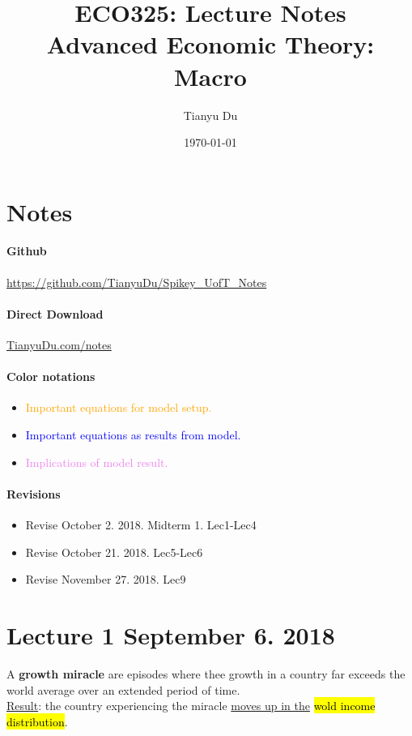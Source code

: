 \documentclass[11pt]{article}
\title{ECO325: Lecture Notes \\ \small Advanced Economic Theory: Macro}
\author{Tianyu Du}
\date{\today}
\begin{document}
    \maketitle
    \doclicenseThis
    \section*{Notes}
    	\paragraph{Github} \url{https://github.com/TianyuDu/Spikey_UofT_Notes}
    	\paragraph{Direct Download} \url{TianyuDu.com/notes}
    	\paragraph{Color notations}
    		\begin{itemize}
    			\item \textcolor{orange}{Important equations for model setup.}
    			\item \textcolor{blue}{Important equations as results from model.}
    			\item \textcolor{violet}{Implications of model result.}
    		\end{itemize}
    \paragraph{Revisions}
    \begin{itemize}
    	\item Revise October 2. 2018. Midterm 1. Lec1-Lec4
    	\item Revise October 21. 2018. Lec5-Lec6
    	\item Revise November 27. 2018. Lec9
    \end{itemize}
    \tableofcontents
    \newpage
    
    \section{Lecture 1 September 6. 2018}
        \begin{definition}
            A \textbf{growth miracle} are episodes where thee growth in a country far exceeds the world average over an extended period of time. \\
            \ul{Result}: the country experiencing the miracle \ul{moves up in the} \hl{wold income distribution}.
        \end{definition}
        
\end{document}
